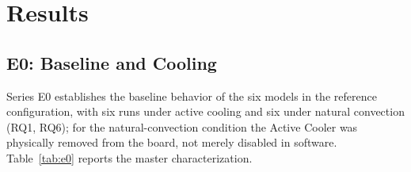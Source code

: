 \documentclass[acmsmall,natbib=false]{acmart}
\begin{document}
\section{Results}\label{sec:results}

\subsection{E0: Baseline and Cooling}\label{sec:results_e0}

Series E0 establishes the baseline behavior of the six models in the
reference configuration, with six runs under active cooling and six under
natural convection (RQ1, RQ6); for the natural-convection condition the
Active Cooler was physically removed from the board, not merely disabled in
software. Table~\ref{tab:e0} reports the master characterization.
\end{document}
